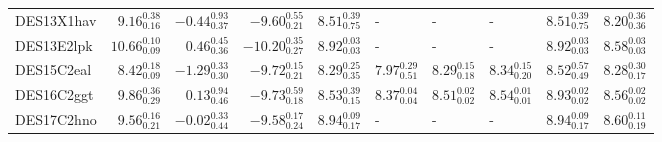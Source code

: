\documentclass[fleqn,usenatbib,]{mnras}
\begin{document}
\begin{table}
\begin{threeparttable}
\begin{tabular}{lrrrllllll}
DES13X1hav &   $9.16 _{\scriptscriptstyle 0.16} ^{\scriptscriptstyle 0.38}$ &  $-0.44 _{\scriptscriptstyle 0.37} ^{\scriptscriptstyle 0.93}$ &   $-9.60 _{\scriptscriptstyle 0.21} ^{\scriptscriptstyle 0.55}$ &  $8.51 _{\scriptscriptstyle 0.75} ^{\scriptscriptstyle 0.39}$ &                                                             - &                                                             - &                                                             - &  $8.51 _{\scriptscriptstyle 0.75} ^{\scriptscriptstyle 0.39}$ &   $8.20 _{\scriptscriptstyle 0.36} ^{\scriptscriptstyle 0.36}$ \\
DES13E2lpk &  $10.66 _{\scriptscriptstyle 0.09} ^{\scriptscriptstyle 0.10}$ &   $0.46 _{\scriptscriptstyle 0.36} ^{\scriptscriptstyle 0.45}$ &  $-10.20 _{\scriptscriptstyle 0.27} ^{\scriptscriptstyle 0.35}$ &  $8.92 _{\scriptscriptstyle 0.03} ^{\scriptscriptstyle 0.03}$ &                                                             - &                                                             - &                                                             - &  $8.92 _{\scriptscriptstyle 0.03} ^{\scriptscriptstyle 0.03}$ &   $8.58 _{\scriptscriptstyle 0.03} ^{\scriptscriptstyle 0.03}$ \\
DES15C2eal &   $8.42 _{\scriptscriptstyle 0.09} ^{\scriptscriptstyle 0.18}$ &  $-1.29 _{\scriptscriptstyle 0.30} ^{\scriptscriptstyle 0.33}$ &   $-9.72 _{\scriptscriptstyle 0.21} ^{\scriptscriptstyle 0.15}$ &  $8.29 _{\scriptscriptstyle 0.35} ^{\scriptscriptstyle 0.25}$ &  $7.97 _{\scriptscriptstyle 0.51} ^{\scriptscriptstyle 0.29}$ &  $8.29 _{\scriptscriptstyle 0.18} ^{\scriptscriptstyle 0.15}$ &  $8.34 _{\scriptscriptstyle 0.20} ^{\scriptscriptstyle 0.15}$ &  $8.52 _{\scriptscriptstyle 0.49} ^{\scriptscriptstyle 0.57}$ &   $8.28 _{\scriptscriptstyle 0.17} ^{\scriptscriptstyle 0.30}$ \\
DES16C2ggt &   $9.86 _{\scriptscriptstyle 0.29} ^{\scriptscriptstyle 0.36}$ &   $0.13 _{\scriptscriptstyle 0.46} ^{\scriptscriptstyle 0.94}$ &   $-9.73 _{\scriptscriptstyle 0.18} ^{\scriptscriptstyle 0.59}$ &  $8.53 _{\scriptscriptstyle 0.15} ^{\scriptscriptstyle 0.39}$ &  $8.37 _{\scriptscriptstyle 0.04} ^{\scriptscriptstyle 0.04}$ &  $8.51 _{\scriptscriptstyle 0.02} ^{\scriptscriptstyle 0.02}$ &  $8.54 _{\scriptscriptstyle 0.01} ^{\scriptscriptstyle 0.01}$ &  $8.93 _{\scriptscriptstyle 0.02} ^{\scriptscriptstyle 0.02}$ &   $8.56 _{\scriptscriptstyle 0.02} ^{\scriptscriptstyle 0.02}$ \\
DES17C2hno &   $9.56 _{\scriptscriptstyle 0.21} ^{\scriptscriptstyle 0.16}$ &  $-0.02 _{\scriptscriptstyle 0.44} ^{\scriptscriptstyle 0.33}$ &   $-9.58 _{\scriptscriptstyle 0.24} ^{\scriptscriptstyle 0.17}$ &  $8.94 _{\scriptscriptstyle 0.17} ^{\scriptscriptstyle 0.09}$ &                                                             - &                                                             - &                                                             - &  $8.94 _{\scriptscriptstyle 0.17} ^{\scriptscriptstyle 0.09}$ &   $8.60 _{\scriptscriptstyle 0.19} ^{\scriptscriptstyle 0.11}$ \\


\end{tabular}
\end{threeparttable}
\end{table}
\end{document}
